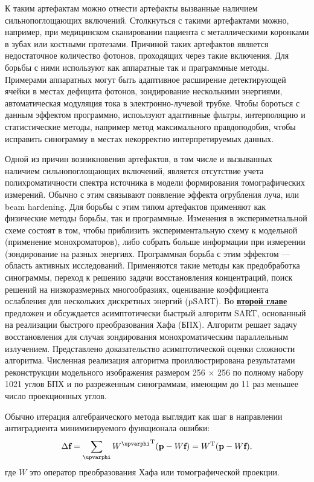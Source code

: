 К таким артефактам можно отнести артефакты вызванные наличием сильнопоглощающих включений.
Столкнуться с такими артефактами можно, например, при медицинском сканировании пациента с металлическими коронками в зубах или костными протезами.
Причиной таких артефактов является недостаточное количество фотонов, проходящих через такие включения.
Для борьбы с ними используют как аппаратные так и праграммные методы.
Примерами аппаратных могут быть адаптивное расширение детектирующей ячейки в местах дефицита фотонов, зондирование несколькими энергиями, автоматическая модуляция тока в электронно-лучевой трубке.
Чтобы бороться с данным эффектом программно, испоьлзуют адаптивные фльтры, интерполяцию и статистические методы, например метод максимального правдоподобия, чтобы исправить синограмму в местах некорректно интерпретируемых данных.

Одной из причин возникновения артефактов, в том числе и вызыванных наличием сильнопоглощающих включений, является отсутствие учета полихроматичности спектра источника в модели формирования томографических измерений.
Обычно с этим связывают появление эффекта огрубления луча, или beam hardening.
Для борьбы с этим типом артефактов применяют как физические методы борьбы, так и программные.
Изменения в экспериметнальной схеме состоят в том, чтобы приблизить экспериментальную схему к модельной (применение монохроматоров), либо собрать больше информации при измерении (зондирование на разных энергиях.
Программная борьба с этим эффектом --- область активных исследований.
Применяются такие методы как предобработка синограммы, переход к решению задачи восстановления концентраций, поиск решений на низкоразмерных многообразиях, оценивание коэффициента ослабления для нескольких дискретных энергий (pSART).
\vspace{5mm}
Во \underline{\textbf{второй главе}} предложен и обсуждается асимптотически быстрый алгоритм SART, основанный на реализации быстрого преобразования Хафа (БПХ).
Алгоритм решает задачу восстановления для случая зондирования монохроматическим параллельным излучением.
Представлено доказательство асимптотической оценки сложности алгоритма.
Численная реализация алгоритма проиллюстрирована результатами реконструкции модельного изображения размером 256 $\times$ 256 по полному набору 1021 углов БПХ и по разреженным синограммам, имеющим до 11 раз меньшее число проекционных углов.

Обычно итерация алгебраического метода выглядит как шаг в направлении антиградиента минимизируемого функционала ошибки:
\begin{equation}\notag
  \Delta \textbf f = \sum_\varphi {{W^\varphi}^{\mathrm T}(\textbf p - W\textbf f) } = W^{\mathrm T}(\textbf p - W \textbf f).
\end{equation}
где $W$ это оператор преобразования Хафа или томографической проекции.
  
